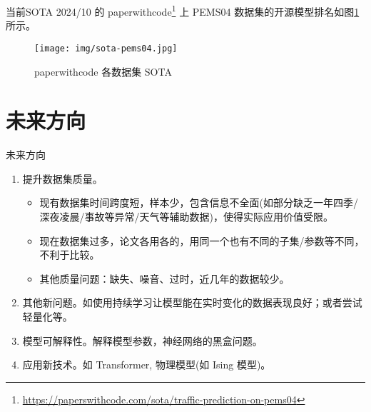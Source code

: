 \documentclass{libs/format}
\begin{document}
\begin{frame}{当前SOTA}
  2024/10 的 paperwithcode\footnote{\url{https://paperswithcode.com/sota/traffic-prediction-on-pems04}} 上 PEMS04 数据集的开源模型排名如图\ref{fig:sota-pems04}所示。

  \begin{figure}
    \centering
    \texttt{[image: img/sota-pems04.jpg]}
    \caption{paperwithcode 各数据集 SOTA}\label{fig:sota-pems04}
  \end{figure}
\end{frame}

\section{未来方向}
\begin{frame}{未来方向}
  \begin{enumerate}
    \item 提升数据集质量。
    \begin{itemize}
      \item 现有数据集时间跨度短，样本少，包含信息不全面(如部分缺乏一年四季/深夜凌晨/事故等异常/天气等辅助数据)，使得实际应用价值受限。
      \item 现在数据集过多，论文各用各的，用同一个也有不同的子集/参数等不同，不利于比较。
      \item 其他质量问题：缺失、噪音、过时，近几年的数据较少。
    \end{itemize}
    \item 其他新问题。如使用持续学习让模型能在实时变化的数据表现良好；或者尝试轻量化等。
    \item 模型可解释性。解释模型参数，神经网络的黑盒问题。
    \item 应用新技术。如 Transformer, 物理模型(如 Ising 模型\cite{T-233})。
  \end{enumerate}
\end{frame}

\begin{frame}
    \printbibliography[title = {参考文献}]
\end{frame}
\end{document}
